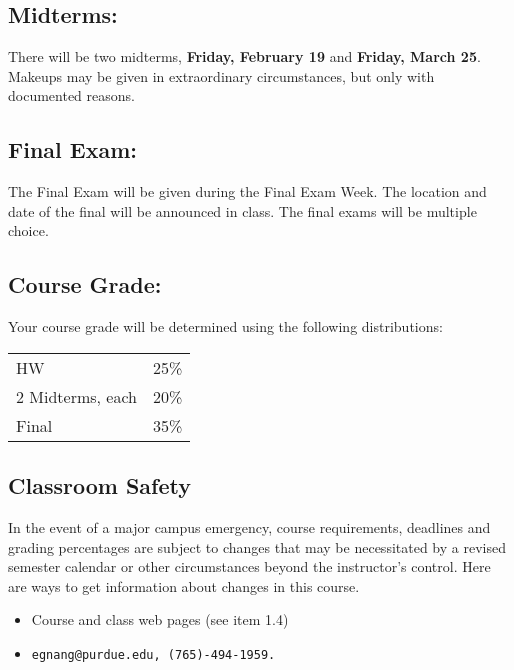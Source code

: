\documentclass[10pt]{article}
\begin{document}
\subsection{Midterms:}  
	There will be two midterms, {\bf Friday, February 19} and 
  {\bf Friday, March 25}. Makeups may be given in extraordinary
  circumstances, but only with documented reasons.

\subsection{Final Exam:}
        The Final Exam will be given during the Final Exam Week.
        The location and date of the final will be announced in class.
	The final exams will be multiple choice.

\subsection{Course Grade:}
        Your course grade will be determined using the following 
        distributions:

\begin{tabular}{ll}\\
        HW 		&    25\%\\
        2 Midterms, each     &  20\%\\
        Final          &     35\%\\
\end{tabular}


\subsection{Classroom Safety}
In the event of a major campus emergency, course requirements,
deadlines and grading percentages are subject to changes that may be
necessitated by a revised semester calendar or other circumstances
beyond the instructor's control. Here are ways to get information
about changes in this course.

\begin{itemize}
\item Course and class web pages (see item 1.4)
\item \tt{egnang@purdue.edu}, \tt{(765)-494-1959}.
\end{itemize}
\end{document}
